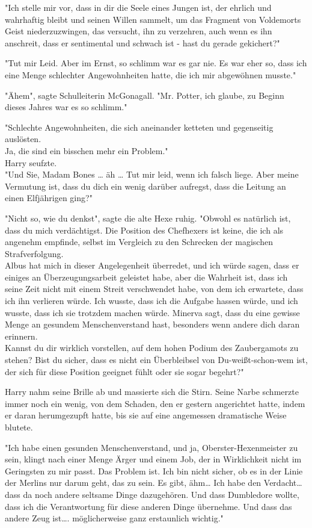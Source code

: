 {"Ich stelle mir vor, dass in dir die Seele eines Jungen ist, der ehrlich und wahrhaftig bleibt und seinen Willen sammelt, um das Fragment von Voldemorts Geist niederzuzwingen, das versucht, ihn zu verzehren, auch wenn es ihn anschreit, dass er sentimental und schwach ist - hast du gerade gekichert?"

"Tut mir Leid. Aber im Ernst, so schlimm war es gar nie. Es war eher so, dass ich eine Menge schlechter Angewohnheiten hatte, die ich mir abgewöhnen musste."

"Ähem", sagte Schulleiterin McGonagall. "Mr. Potter, ich glaube, zu Beginn dieses Jahres war es so schlimm."

"Schlechte Angewohnheiten, die sich aneinander ketteten und gegenseitig auslösten.\\ Ja, die sind ein bisschen mehr ein Problem."\\ Harry seufzte.\\ "Und Sie, Madam Bones … äh … Tut mir leid, wenn ich falsch liege. Aber meine Vermutung ist, dass du dich ein wenig darüber aufregst, dass die Leitung an einen Elfjährigen ging?"

"Nicht so, wie du denkst", sagte die alte Hexe ruhig. "Obwohl es natürlich ist, dass du mich verdächtigst. Die Position des Chefhexers ist keine, die ich als angenehm empfinde, selbst im Vergleich zu den Schrecken der magischen Strafverfolgung.\\ Albus hat mich in dieser Angelegenheit überredet, und ich würde sagen, dass er einiges an Überzeugungsarbeit geleistet habe, aber die Wahrheit ist, dass ich seine Zeit nicht mit einem Streit verschwendet habe, von dem ich erwartete, dass ich ihn verlieren würde. Ich wusste, dass ich die Aufgabe hassen würde, und ich wusste, dass ich sie trotzdem machen würde. Minerva sagt, dass du eine gewisse Menge an gesundem Menschenverstand hast, besonders wenn andere dich daran erinnern.\\ Kannst du dir wirklich vorstellen, auf dem hohen Podium des Zaubergamots zu stehen? Bist du sicher, dass es nicht ein Überbleibsel von Du-weißt-schon-wem ist, der sich für diese Position geeignet fühlt oder sie sogar begehrt?"

Harry nahm seine Brille ab und massierte sich die Stirn. Seine Narbe schmerzte immer noch ein wenig, von dem Schaden, den er gestern angerichtet hatte, indem er daran herumgezupft hatte, bis sie auf eine angemessen dramatische Weise blutete.

"Ich habe einen gesunden Menschenverstand, und ja, Oberster-Hexenmeister zu sein, klingt nach einer Menge Ärger und einem Job, der in Wirklichkeit nicht im Geringsten zu mir passt. Das Problem ist. Ich bin nicht sicher, ob es in der Linie der Merlins nur darum geht, das zu sein. Es gibt, ähm… Ich habe den Verdacht… dass da noch andere seltsame Dinge dazugehören. Und dass Dumbledore wollte, dass ich die Verantwortung für diese anderen Dinge übernehme. Und dass das andere Zeug ist…. möglicherweise ganz erstaunlich wichtig."

}
